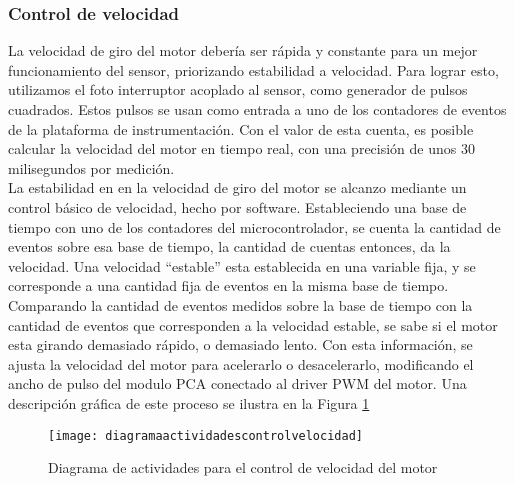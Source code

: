 
\subsubsection{Control de velocidad} %
\label{it6:ssub:control_de_velocidad}

La velocidad de giro del motor debería ser rápida y constante para un mejor funcionamiento del sensor, priorizando estabilidad a velocidad. Para lograr esto, utilizamos el foto interruptor acoplado al sensor, como generador de pulsos cuadrados. Estos pulsos se usan como entrada a uno de los contadores de eventos de la plataforma de instrumentación. Con el valor de esta cuenta, es posible calcular la velocidad del motor en tiempo real, con una precisión de unos 30 milisegundos por medición. \\

La estabilidad en en la velocidad de giro del motor se alcanzo mediante un control básico de velocidad, hecho por software. Estableciendo una base de tiempo con uno de los contadores del microcontrolador, se cuenta la cantidad de eventos sobre esa base de tiempo, la cantidad de cuentas entonces, da la velocidad. Una velocidad ``estable'' esta establecida en una variable fija, y se corresponde a una cantidad fija de eventos en la misma base de tiempo. Comparando la cantidad de eventos medidos sobre la base de tiempo con la cantidad de eventos que corresponden a la velocidad estable, se sabe si el motor esta girando demasiado rápido, o demasiado lento. Con esta información, se ajusta la velocidad del motor para acelerarlo o desacelerarlo, modificando el ancho de pulso del modulo PCA conectado al driver PWM del motor. Una descripción gráfica de este proceso se ilustra en la Figura \ref{fig:diagramaactividadescontrolvelocidad}

\begin{figure}[h]
  \centering
  \texttt{[image: diagramaactividadescontrolvelocidad]}
  \caption{Diagrama de actividades para el control de velocidad del motor}\label{fig:diagramaactividadescontrolvelocidad}
\end{figure}





